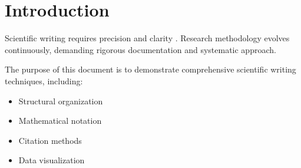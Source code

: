 \section{Introduction}
Scientific writing requires precision and clarity \cite{example2023}. Research methodology evolves continuously, demanding rigorous documentation and systematic approach.

The purpose of this document is to demonstrate comprehensive scientific writing techniques, including:

\begin{itemize}
    \item Structural organization
    \item Mathematical notation
    \item Citation methods
    \item Data visualization
\end{itemize}
